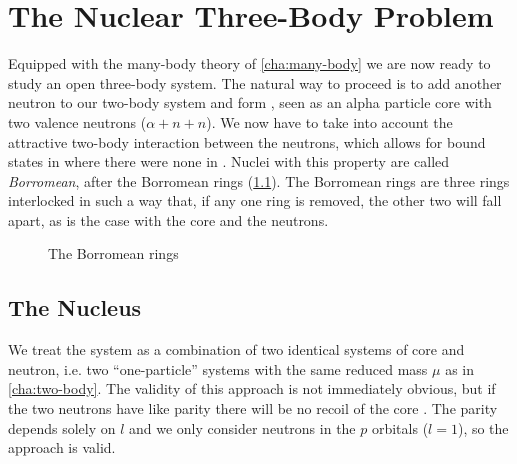 \documentclass[../main/report.tex]{subfiles}
\begin{document}
\chapter{The Nuclear Three-Body Problem}
\label{cha:three-body}


Equipped with the many-body theory of \cref{cha:many-body} we are now ready to study an open three-body system.
The natural way to proceed is to add another neutron to our two-body  system and form , seen as an alpha particle core with two valence neutrons ($\alpha + n + n$).
We now have to take into account the attractive two-body interaction between the neutrons, which allows for bound states in  where there were none in .
Nuclei with this property are called \emph{Borromean}, after the Borromean rings (\cref{fig:borromean}). 
The Borromean rings are three rings interlocked in such a way that, if any one ring is removed, the other two will fall apart, as is the case with the core and the neutrons.

\begin{figure}[h]
  \newcommand{\circdist}{1.2}
  \newcommand{\circrad}{2}
  \centering
  \caption{The Borromean rings}
  \label{fig:borromean}
\end{figure}

\section{The  Nucleus}

We treat the  system as a combination of two identical  systems of core and neutron, i.e. two ``one-particle'' systems with the same reduced mass $\mu$ as in \cref{cha:two-body}.
The validity of this approach is not immediately obvious, but 
if the two neutrons have like parity there will be no recoil of the core \cite{suzuki}. 
The parity depends solely on $l$ and we only consider neutrons in the $p$ orbitals ($l=1$), so the approach is valid.
\end{document}
